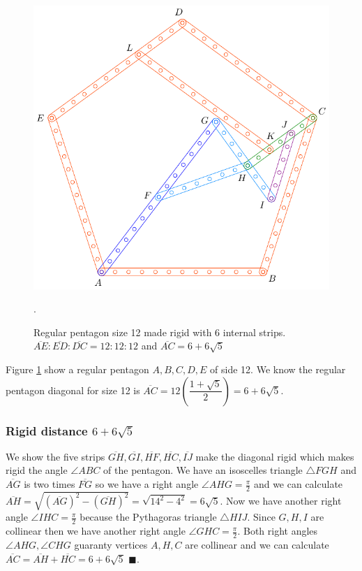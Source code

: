 \documentclass[11pt]{article}
\begin{document}
\begin{figure}[h]
 \centering
 \includegraphics[scale=0.8]{12/penta12-6a}
 \caption{Regular pentagon size 12 made rigid with 6 internal strips. $\overline{AE}:\overline{ED}:\overline{DC} = 12:12:12$ and $\overline{AC} = 6 + 6\sqrt5$}.
 \label{fig:penta12-6a}
\end{figure}

Figure \ref{fig:penta12-6a} show a regular pentagon $A,B,C,D,E$ of side 12. We know the regular pentagon diagonal for size 12 is $\overline{AC} = 12\left(\dfrac{1+\sqrt5}2\right) = 6 + 6\sqrt5$. 

\subsubsection{Rigid distance $6 + 6\sqrt5$}

We show the five strips $\overline{GH},\overline{GI},\overline{HF},\overline{HC},\overline{IJ}$ make the diagonal rigid which makes rigid the angle $\angle{ABC}$ of the pentagon. We have an isoscelles triangle $\triangle{FGH}$ and $\overline{AG}$ is two times $\overline{FG}$ so we have a right angle $\angle{AHG} = \frac{\pi}2$ and we can calculate $\overline{AH} = \sqrt{(\overline{AG})^2 - (\overline{GH})^2} = \sqrt{14^2-4^2} = 6\sqrt5$. Now we have another right angle $\angle{IHC} = \frac{\pi}2$ because the Pythagoras triangle $\triangle{HIJ}$. Since $G,H,I$ are collinear then we have another right angle $\angle{GHC}=\frac{\pi}2$. Both right angles $\angle{AHG},\angle{CHG}$ guaranty vertices $A,H,C$ are collinear and we can calculate $\overline{AC} = \overline{AH} + \overline{HC} = 6 + 6\sqrt5$ $\blacksquare$.
\end{document}
